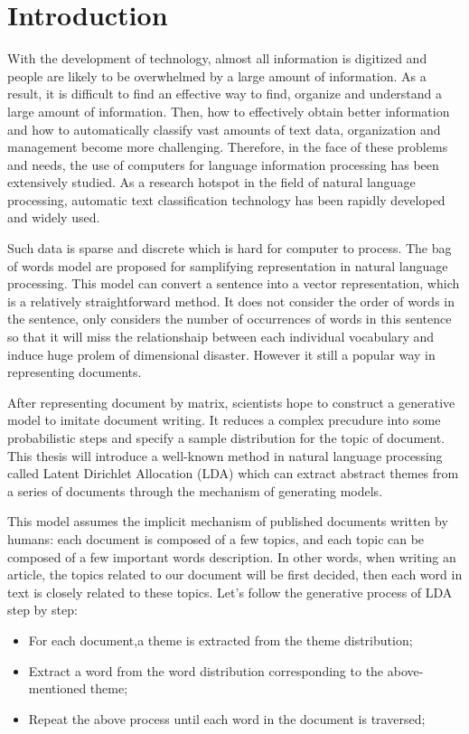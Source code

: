 \afterpage{\blankpage}

\chapter{Introduction}\label{s-intro}


With the development of technology, almost all information is digitized and people are  likely to be overwhelmed by a large amount of information. As a result, it is difficult to find an effective way to find, organize and understand a large amount of information{\cite{intro-back}}. Then, how to effectively obtain better information and how to automatically classify vast amounts of text data, organization and management become more challenging. Therefore, in the face of these problems and needs, the use of computers for language information processing has been extensively studied. As a research hotspot in the field of natural language processing, automatic text classification technology has been rapidly developed and widely used.


Such data is sparse and discrete which is hard for computer to process. The bag of words model are proposed for samplifying representation in natural language processing. This model can convert a sentence into a vector representation, which is a relatively straightforward method. It does not consider the order of words in the sentence, only considers the number of occurrences of words  in this sentence so that it will miss the relationshaip between each individual vocabulary and induce huge prolem of dimensional disaster. However it still a popular way in representing documents.

After representing document by matrix, scientists hope to construct a generative model to
imitate document writing. It reduces a complex precudure into some probabilistic steps and specify a sample  distribution for the topic of  document\cite{find}. This thesis will introduce  a  well-known method in natural language processing called Latent Dirichlet Allocation (LDA) which can extract  abstract themes  from a series of documents through the mechanism of generating models.


This model assumes the implicit mechanism of published documents written by humans: each document is composed of a few topics, and each topic can be composed of a few important words description. In other words, when writing an article, the topics related to our document will be first decided, then each word in text is closely related to these topics. Let's follow the generative process of LDA step by step:
\begin{itemize}
  \item For each document,a theme is extracted from the theme distribution;
  \item Extract a word from the word distribution corresponding to the above-mentioned theme;
  \item Repeat the above process until each word in the document is traversed;
\end{itemize}

